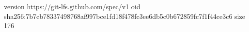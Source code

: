 version https://git-lfs.github.com/spec/v1
oid sha256:7b7cb78337498768af997bce1fd18f478fc3ee6db5c0b672859fc7f1f44ce3c6
size 176
